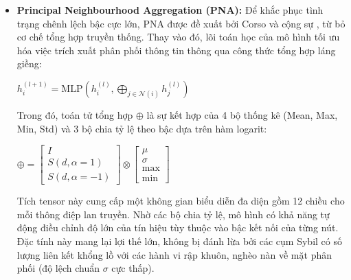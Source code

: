 \begin{itemize}[label={--}, itemsep=5pt]
    \begin{center}
    \(
        h_v^{(k)} = \text{MLP}^{(k)} \left( (1 + \epsilon^{(k)}) h_v^{(k-1)} + \sum_{u \in \mathcal{N}(v)} \text{ReLU} \left( h_u^{(k-1)} + e_{uv} \right) \right)
    \)
    \end{center}

    Trong đó, $e_{uv}$ chính là trọng số vô hướng $w_{ij}$ đại diện cho chi phí hành vi. Việc thực hiện thực nghiệm trên GINE không chỉ cho phép nhận diện được các cấu trúc hình học dị thường của các cụm Sybil (như mạng lưới hình sao), mà còn phân biệt được bản chất của các liên kết đó.

    \item \textbf{Principal Neighbourhood Aggregation (PNA):} Để khắc phục tình trạng chênh lệch bậc cực lớn, PNA được đề xuất bởi Corso và cộng sự \cite{corso2020principal}, từ bỏ cơ chế tổng hợp truyền thống. Thay vào đó, lõi toán học của mô hình tối ưu hóa việc trích xuất phân phối thông tin thông qua công thức tổng hợp láng giềng:

    \begin{center}
    \(
        h_i^{(l+1)} = \text{MLP} \left( h_i^{(l)}, \bigoplus_{j \in \mathcal{N}(i)} h_j^{(l)} \right)
    \)
    \end{center}

    Trong đó, toán tử tổng hợp $\oplus$ là sự kết hợp của 4 bộ thống kê (Mean, Max, Min, Std) và 3 bộ chia tỷ lệ theo bậc dựa trên hàm logarit:

    \begin{center}
    \(
        \oplus = \begin{bmatrix} I \\ S(d, \alpha=1) \\ S(d, \alpha=-1) \end{bmatrix} \otimes \begin{bmatrix} \mu \\ \sigma \\ \max \\ \min \end{bmatrix}
    \)
    \end{center}

    Tích tensor này cung cấp một không gian biểu diễn đa diện gồm 12 chiều cho mỗi thông điệp lan truyền. Nhờ các bộ chia tỷ lệ, mô hình có khả năng tự động điều chỉnh độ lớn của tín hiệu tùy thuộc vào bậc kết nối của từng nút. Đặc tính này mang lại lợi thế lớn, không bị đánh lừa bởi các cụm Sybil có số lượng liên kết khổng lồ với các hành vi rập khuôn, nghèo nàn về mặt phân phối (độ lệch chuẩn $\sigma$ cực thấp).
    

\end{itemize}

